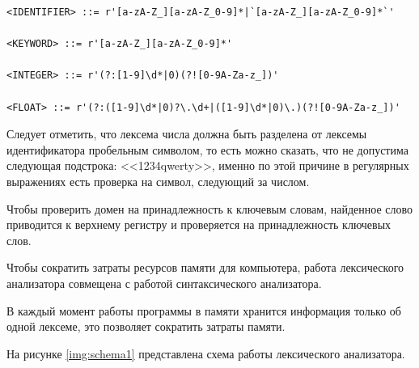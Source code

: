 \begin{lstlisting}[label=lst:lex,caption=Регулярные выражения для доменов идентификаторов]
<IDENTIFIER> ::= r'[a-zA-Z_][a-zA-Z_0-9]*|`[a-zA-Z_][a-zA-Z_0-9]*`'

<KEYWORD> ::= r'[a-zA-Z_][a-zA-Z_0-9]*'

<INTEGER> ::= r'(?:[1-9]\d*|0)(?![0-9A-Za-z_])'

<FLOAT> ::= r'(?:([1-9]\d*|0)?\.\d+|([1-9]\d*|0)\.)(?![0-9A-Za-z_])'
\end{lstlisting}


Следует отметить, что лексема числа должна быть разделена от лексемы идентификатора пробельным символом, то есть можно сказать, что не допустима следующая подстрока: <<1234qwerty>>, именно по этой причине в регулярных выражениях есть проверка на символ, следующий за числом.


Чтобы проверить домен на принадлежность к ключевым словам, найденное слово приводится к верхнему регистру и проверяется на принадлежность ключевых слов.

Чтобы сократить затраты ресурсов памяти для компьютера, работа лексического анализатора совмещена с работой синтаксического анализатора. 


В каждый момент работы программы в памяти хранится информация только об одной лексеме, это позволяет сократить затраты памяти. 

На рисунке \ref{img:schema1} представлена схема работы лексического анализатора.

